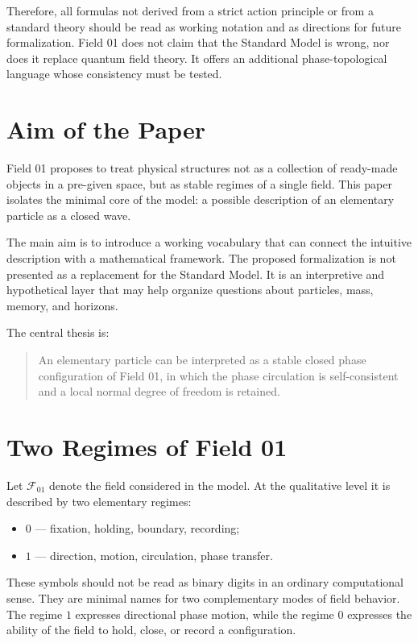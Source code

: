 \documentclass[11pt,a4paper]{article}
\newcommand{\field}{\mathcal{F}_{01}}
\begin{document}
Therefore, all formulas not derived from a strict action principle or from a standard theory should be read as working notation and as directions for future formalization. Field 01 does not claim that the Standard Model is wrong, nor does it replace quantum field theory. It offers an additional phase-topological language whose consistency must be tested.

\section{Aim of the Paper}

Field 01 proposes to treat physical structures not as a collection of ready-made objects in a pre-given space, but as stable regimes of a single field. This paper isolates the minimal core of the model: a possible description of an elementary particle as a closed wave.

The main aim is to introduce a working vocabulary that can connect the intuitive description with a mathematical framework. The proposed formalization is not presented as a replacement for the Standard Model. It is an interpretive and hypothetical layer that may help organize questions about particles, mass, memory, and horizons.

The central thesis is:
\begin{quote}
An elementary particle can be interpreted as a stable closed phase configuration of Field 01, in which the phase circulation is self-consistent and a local normal degree of freedom is retained.
\end{quote}

\section{Two Regimes of Field 01}

Let $\field$ denote the field considered in the model. At the qualitative level it is described by two elementary regimes:
\begin{itemize}
\item $0$ --- fixation, holding, boundary, recording;
\item $1$ --- direction, motion, circulation, phase transfer.
\end{itemize}

These symbols should not be read as binary digits in an ordinary computational sense. They are minimal names for two complementary modes of field behavior. The regime $1$ expresses directional phase motion, while the regime $0$ expresses the ability of the field to hold, close, or record a configuration.
\end{document}
